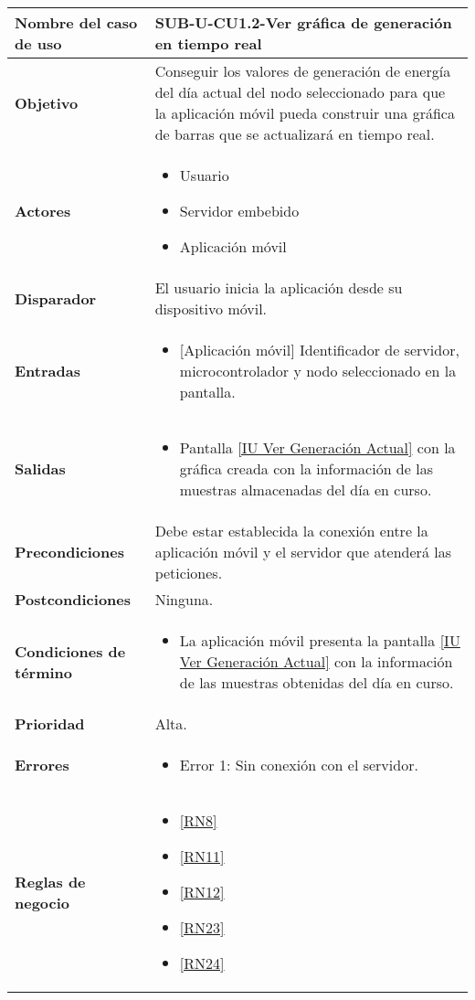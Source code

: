\begin{longtable}{|J{5cm}|J{10.3cm}|}
	\hline
	\textbf{Nombre del caso de uso} &
		SUB-U-CU1.2-Ver gráfica de generación en tiempo real \\ \hline
	\textbf{Objetivo} &
		Conseguir los valores de generación de energía del día actual del nodo seleccionado para que la aplicación móvil pueda construir una gráfica de barras que se actualizará en tiempo real. \\ \hline
	\textbf{Actores} &
		\begin{itemize}
		    \item Usuario
			\item Servidor embebido
			\item Aplicación móvil
		\end{itemize} \\ \hline
	\textbf{Disparador} & 
	    El usuario inicia la aplicación desde su dispositivo móvil.\\ \hline 
	\textbf{Entradas} & 
		\begin{itemize}
				\item{[Aplicación móvil]} Identificador de servidor, microcontrolador y nodo seleccionado en la pantalla.
		\end{itemize}\\ \hline 
	\textbf{Salidas} & 
		\begin{itemize}
			\item Pantalla \hyperref[fig:monitoreoReal]{[IU Ver Generación Actual]} con la gráfica creada con la información de las muestras almacenadas del día en curso.
		\end{itemize} \\ \hline
	\textbf{Precondiciones} &
		Debe estar establecida la conexión entre la aplicación móvil y el servidor que atenderá las peticiones.
		\\ \hline
	\textbf{Postcondiciones} &
		Ninguna.\\ \hline
	\textbf{Condiciones de término} & 
		\begin{itemize}
			\item La aplicación móvil presenta la pantalla \hyperref[fig:monitoreoReal]{[IU Ver Generación Actual]} con la información de las muestras obtenidas del día en curso.
		\end{itemize} \\ \hline 
	\textbf{Prioridad} & 
		Alta. \\ \hline
	\textbf{Errores} & 
		\begin{itemize}
		    \item \label{CUU1.2:Error1} Error 1: Sin conexión con el servidor.
		\end{itemize} \\ \hline
	\textbf{Reglas de negocio} & 
		\begin{itemize}
		    \item \ref{RN8}
			\item \ref{RN11}
			\item \ref{RN12}
			\item \ref{RN23}
			\item \ref{RN24}
		\end{itemize} \\ \hline
\end{longtable}

